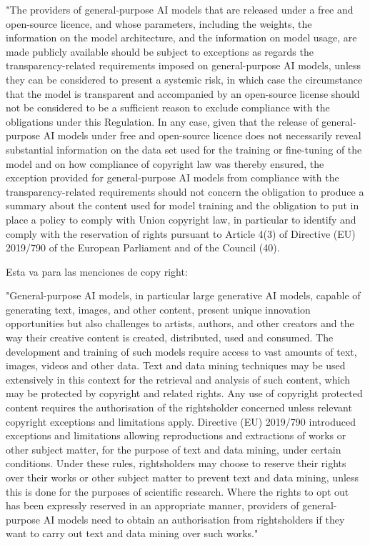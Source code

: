 "The providers of general-purpose AI models that are released under a free and open-source licence, and whose parameters, including the weights, the information on the model architecture, and the information on model usage, are made publicly available should be subject to exceptions as regards the transparency-related requirements imposed on general-purpose AI models, unless they can be considered to present a systemic risk, in which case the circumstance that the model is transparent and accompanied by an open-source license should not be considered to be a sufficient reason to exclude compliance with the obligations under this Regulation. In any case, given that the release of general-purpose AI models under free and open-source licence does not necessarily reveal substantial information on the data set used for the training or fine-tuning of the model and on how compliance of copyright law was thereby ensured, the exception provided for general-purpose AI models from compliance with the transparency-related requirements should not concern the obligation to produce a summary about the content used for model training and the obligation to put in place a policy to comply with Union copyright law, in particular to identify and comply with the reservation of rights pursuant to Article 4(3) of Directive (EU) 2019/790 of the European Parliament and of the Council (40).


Esta va para las menciones de copy right:

"General-purpose AI models, in particular large generative AI models, capable of generating text, images, and other content, present unique innovation opportunities but also challenges to artists, authors, and other creators and the way their creative content is created, distributed, used and consumed. The development and training of such models require access to vast amounts of text, images, videos and other data. Text and data mining techniques may be used extensively in this context for the retrieval and analysis of such content, which may be protected by copyright and related rights. Any use of copyright protected content requires the authorisation of the rightsholder concerned unless relevant copyright exceptions and limitations apply. Directive (EU) 2019/790 introduced exceptions and limitations allowing reproductions and extractions of works or other subject matter, for the purpose of text and data mining, under certain conditions. Under these rules, rightsholders may choose to reserve their rights over their works or other subject matter to prevent text and data mining, unless this is done for the purposes of scientific research. Where the rights to opt out has been expressly reserved in an appropriate manner, providers of general-purpose AI models need to obtain an authorisation from rightsholders if they want to carry out text and data mining over such works." 

